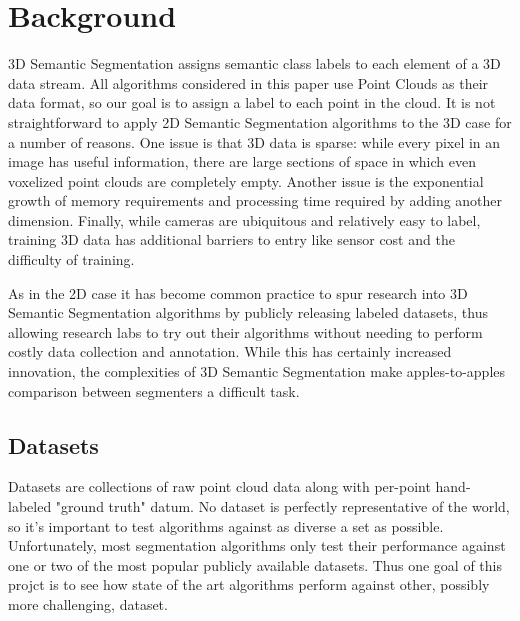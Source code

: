 \section{Background}
\label{chap:background}

3D Semantic Segmentation assigns semantic class labels to each element of a 3D data stream. All algorithms considered in this paper use Point Clouds as their data format, so our goal is to assign a label to each point in the cloud. It is not straightforward to apply 2D Semantic Segmentation algorithms to the 3D case for a number of reasons. One issue is that 3D data is sparse: while every pixel in an image has useful information, there are large sections of space in which even voxelized point clouds are completely empty. Another issue is the exponential growth of memory requirements and processing time required by adding another dimension. Finally, while cameras are ubiquitous and relatively easy to label, training 3D data has additional barriers to entry like sensor cost and the difficulty of training.

As in the 2D case it has become common practice to spur research into 3D Semantic Segmentation algorithms by publicly releasing labeled datasets, thus allowing research labs to try out their algorithms without needing to perform costly data collection and annotation. While this has certainly increased innovation, the complexities of 3D Semantic Segmentation make apples-to-apples comparison between segmenters a difficult task.

\subsection{Datasets}
\label{chap:datasets}

Datasets are collections of raw point cloud data along with per-point hand-labeled "ground truth" datum. No dataset is perfectly representative of the world, so it's important to test algorithms against as diverse a set as possible. Unfortunately, most segmentation algorithms only test their performance against one or two of the most popular publicly available datasets. Thus one goal of this projct is to see how state of the art algorithms perform against other, possibly more challenging, dataset.


